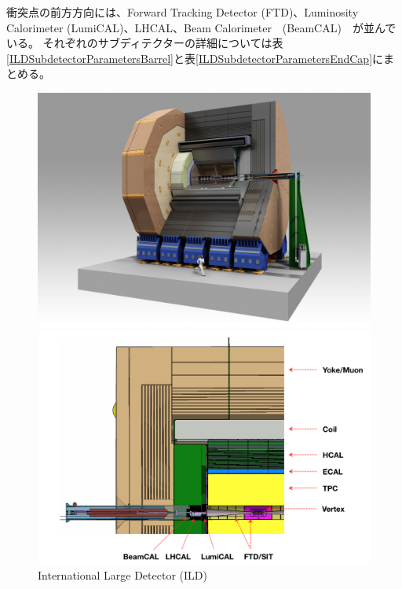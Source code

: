 衝突点の前方方向には、Forward Tracking Detector (FTD)、Luminosity Calorimeter (LumiCAL)、LHCAL、Beam Calorimeter　(BeamCAL)　が並んでいる。
それぞれのサブディテクターの詳細については表\ref{ILDSubdetectorParametersBarrel}と表\ref{ILDSubdetectorParametersEndCap}にまとめる。

\begin{figure}[htbp]
 \centering
 \begin{minipage}{1.0\textwidth}
  \centering
   \begin{minipage}{0.48\textwidth}
    \centering
    \includegraphics[width=1.0\textwidth, clip]{Figure/1Introduction/5-1InternationalLargeDetector.jpg}
   \end{minipage}
   \begin{minipage}{0.48\textwidth}
   \centering
    \includegraphics[width=1.0\textwidth, clip]{Figure/1Introduction/5-2InternationalLargeDetector.png}
   \end{minipage}
  \end{minipage}  
  \caption{International Large Detector (ILD) }
  \label{5-1InternationalLargeDetector}
\end{figure}

